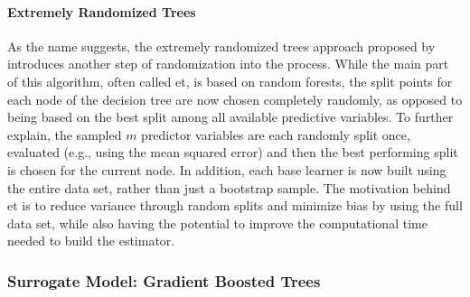 \paragraph{Extremely Randomized Trees}
As the name suggests, the extremely randomized trees approach proposed by \citet{geurts2006extremely} introduces another step of randomization into the process. While the main part of this algorithm, often called \gls{et}, is based on random forests, the split points for each node of the decision tree are now chosen completely randomly, as opposed to being based on the best split among all available predictive variables. To further explain, the sampled $m$ predictor variables are each randomly split once, evaluated (e.g., using the mean squared error) and then the best performing split is chosen for the current node. In addition, each base learner is now built using the entire data set, rather than just a bootstrap sample. The motivation behind \gls{et} is to reduce variance through random splits and minimize bias by using the full data set, while also having the potential to improve the computational time needed to build the estimator.

\subsubsection{Surrogate Model: Gradient Boosted Trees}

